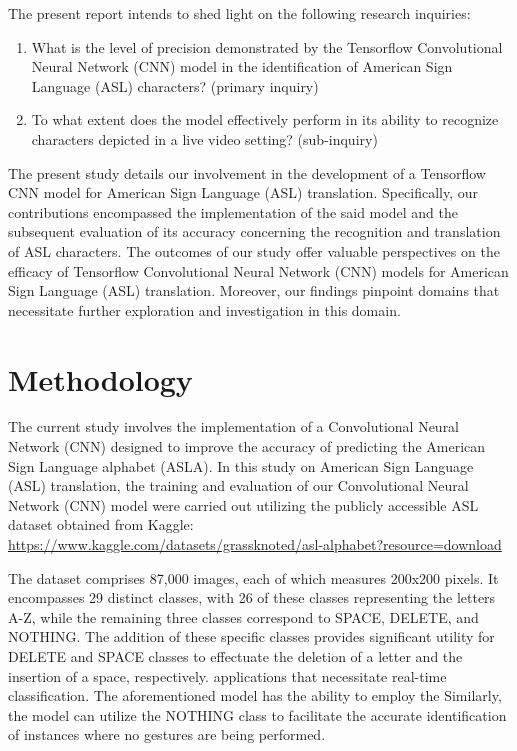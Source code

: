 \documentclass[conference]{IEEEtran}
\begin{document}
The present report intends to shed light on the following research inquiries:

\begin{enumerate}
    \item What is the level of precision demonstrated by the Tensorflow Convolutional Neural Network (CNN) model in the identification of American Sign Language (ASL) characters? (primary inquiry)
    \item To what extent does the model effectively perform in its ability to recognize characters depicted in a live video setting? (sub-inquiry)
\end{enumerate}

The present study details our involvement in the development of a Tensorflow CNN model for American Sign Language (ASL) translation. Specifically, our contributions encompassed the implementation of the said model and the subsequent evaluation of its accuracy concerning the recognition and translation of ASL characters. The outcomes of our study offer valuable perspectives on the efficacy of Tensorflow Convolutional Neural Network (CNN) models for American Sign Language (ASL) translation. Moreover, our findings pinpoint domains that necessitate further exploration and investigation in this domain.


\section{Methodology}

The current study involves the implementation of a Convolutional Neural Network (CNN) designed to improve the accuracy of predicting the American Sign Language alphabet (ASLA). In this study on American Sign Language (ASL) translation, the training and evaluation of our Convolutional Neural Network (CNN) model were carried out utilizing the publicly accessible ASL dataset obtained from Kaggle: \url{https://www.kaggle.com/datasets/grassknoted/asl-alphabet?resource=download}

The dataset comprises 87,000 images, each of which measures 200x200 pixels. It encompasses 29 distinct classes, with 26 of these classes representing the letters A-Z, while the remaining three classes correspond to SPACE, DELETE, and NOTHING. The addition of these specific classes provides significant utility for DELETE and SPACE classes to effectuate the deletion of a letter and the insertion of a space, respectively. applications that necessitate real-time classification. The aforementioned model has the ability to employ the Similarly, the model can utilize the NOTHING class to facilitate the accurate identification of instances where no gestures are being performed.
\end{document}
